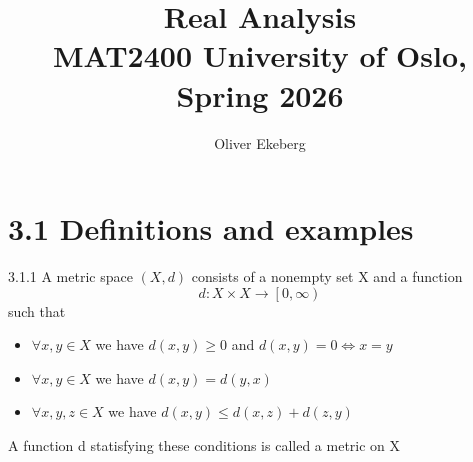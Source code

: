 \documentclass[a4paper,norsk]{article}
\title{Real Analysis \\ MAT2400 University of Oslo, Spring 2026}
\author{Oliver Ekeberg}
\renewcommand{\geq}{\geqslant}
\renewcommand{\leq}{\leqslant}
\begin{document}
\tableofcontents


\section*{3.1 Definitions and examples}


\begin{definitionbox}{3.1.1}{}
A metric space $ \left( X, d \right)  $ consists of a nonempty set X and a function 
\[
    d: X \times X \rightarrow \left[ 0, \infty \right)
\]
such that 
\begin{itemize}
    \item $ \forall x, y \in X $ we have $ d(x, y) \geq 0 $ and $ d(x,y) = 0 \iff x=y $ 
    \item $ \forall x, y \in X $ we have $ d(x,y) = d(y,x) $ 
    \item $ \forall x, y, z \in X $ we have $ d(x,y) \leq d(x,z) + d(z,y) $ 
\end{itemize}
A function d statisfying these conditions is called a metric on X
\end{definitionbox}
\end{document}
